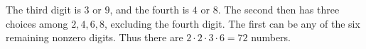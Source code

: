 The third digit is $3$ or $9$, and the fourth is $4$ or $8$. The second then has three choices among $2,4,6,8$, excluding the fourth digit. The first can be any of the six remaining nonzero digits. Thus there are $2\cdot2\cdot3\cdot6=\boxed{72}$ numbers.
